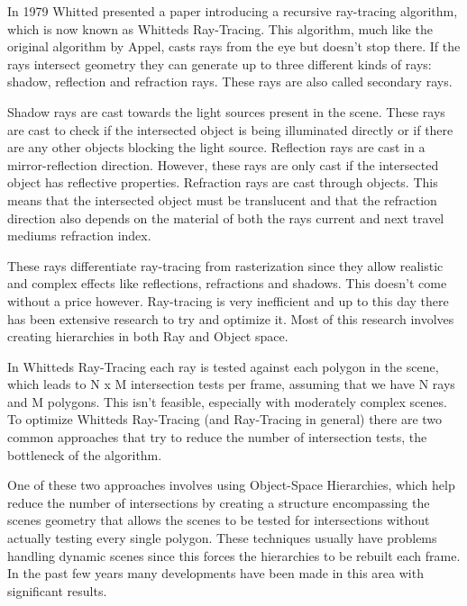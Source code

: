 \documentclass{llncs}
\begin{document}
\medskip

In 1979 Whitted \cite{Whitted80} presented a paper introducing a recursive ray-tracing algorithm, which is now known as Whitteds Ray-Tracing. 
This algorithm, much like the original algorithm by Appel, casts rays from the eye but doesn't stop there. 
If the rays intersect geometry they can generate up to three different kinds of rays: shadow, reflection and refraction rays. These rays are also called secondary rays.

\medskip

Shadow rays are cast towards the light sources present in the scene. These rays are cast to check if the intersected object is being illuminated directly or if there are any other objects blocking the light source. 
Reflection rays are cast in a mirror-reflection direction. However, these rays are only cast if the intersected object has reflective properties. 
Refraction rays are cast through objects. This means that the intersected object must be translucent and that the refraction direction also depends on the material of both the rays current and next travel mediums refraction index.

\medskip

These rays differentiate ray-tracing from rasterization since they allow realistic and complex effects like reflections, refractions and shadows. This doesn't come without a price however. Ray-tracing is very inefficient and up to this day there has been extensive research to try and optimize it. Most of this research involves creating hierarchies in both Ray and Object space. 

\medskip

In Whitteds Ray-Tracing \cite{Whitted80} each ray is tested against each polygon in the scene, which leads to N x M intersection tests per frame, assuming that we have N rays and M polygons. This isn't feasible, especially with moderately complex scenes. To optimize Whitteds Ray-Tracing (and Ray-Tracing in general) there are two common approaches that try to reduce the number of intersection tests, the bottleneck of the algorithm.

\medskip

One of these two approaches involves using Object-Space Hierarchies, which help reduce the number of intersections by creating a structure encompassing the scenes geometry that allows the scenes to be tested for intersections without actually testing every single polygon. These techniques usually have problems handling dynamic scenes since this forces the hierarchies to be rebuilt each frame. In the past few years many developments have been made in this area with significant results.
\end{document}
